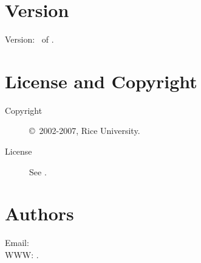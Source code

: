 \documentclass[english]{article}
\begin{document}
\section{Version}

Version: \Version\ of \Date.

\section{License and Copyright}

\begin{description}
\item[Copyright] \copyright\ 2002-2007, Rice University.
\item[License] See .
\end{description}

\section{Authors}

Email:  \\
WWW: .

\LatexManEnd
\end{document}
